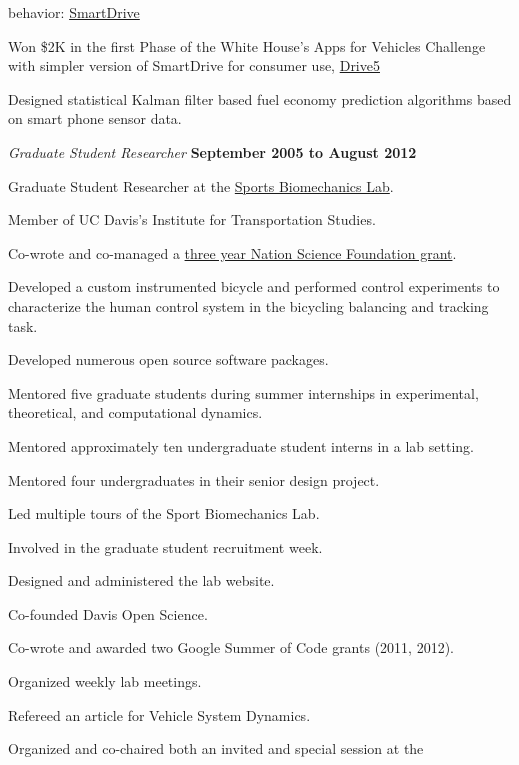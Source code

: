 \documentclass[10pt]{article}
\newenvironment{outerlist}[1][\enskip\textbullet]%
        {\begin{itemize}[#1]}{\end{itemize}%
         \vspace{-.6\baselineskip}}
\newenvironment{innerlist}[1][\enskip\textbullet]%
        {\begin{compactitem}[#1]}{\end{compactitem}}
\begin{document}
\begin{outerlist}
\begin{innerlist}
      behavior: \href{http://smartdrive.ucdavis.edu}{SmartDrive}
    \item Won \$2K in the first Phase of the White House's Apps for Vehicles
      Challenge with simpler version of SmartDrive for consumer use,
      \href{http://drive5.us}{Drive5}
    \item Designed statistical Kalman filter based fuel economy prediction
      algorithms based on smart phone sensor data.
  \end{innerlist}
  \item[] \textit{Graduate Student Researcher}%
        \hfill \textbf{September 2005 to August 2012}
  \begin{innerlist}
    \item Graduate Student Researcher at the
      \href{http://biosport.ucdavis.edu}{Sports Biomechanics Lab}.
    \item Member of UC Davis's Institute for Transportation Studies.
    \item Co-wrote and co-managed a
        \href{http://nsf.gov/awardsearch/showAward.do?AwardNumber=0928339}{three year
        Nation Science Foundation grant}.
    \item Developed a custom instrumented bicycle and performed control
        experiments to characterize the human control system in the bicycling
        balancing and tracking task.
    \item Developed numerous open source software packages.
    \item Mentored five graduate students during summer internships in
      experimental, theoretical, and computational dynamics.
    \item Mentored approximately ten undergraduate student interns in a lab
      setting.
    \item Mentored four undergraduates in their senior design project.
    \item Led multiple tours of the Sport Biomechanics Lab.
    \item Involved in the graduate student recruitment week.
    \item Designed and administered the lab website.
    \item Co-founded Davis Open Science.
    \item Co-wrote and awarded two Google Summer of Code grants (2011, 2012).
    \item Organized weekly lab meetings.
    \item Refereed an article for Vehicle System Dynamics.
    \item Organized and co-chaired both an invited and special session at the

\end{innerlist}
\end{outerlist}
\end{document}
